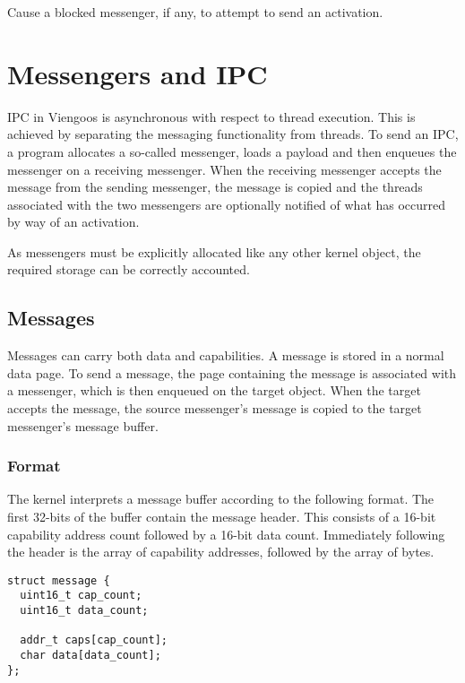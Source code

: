 Cause a blocked messenger, if any, to attempt to send an activation.


\chapter{Messengers and IPC}

IPC in Viengoos is asynchronous with respect to thread execution.
This is achieved by separating the messaging functionality from
threads.  To send an IPC, a program allocates a so-called messenger,
loads a payload and then enqueues the messenger on a receiving
messenger.  When the receiving messenger accepts the message from the
sending messenger, the message is copied and the threads associated
with the two messengers are optionally notified of what has occurred by
way of an activation.

As messengers must be explicitly allocated like any other kernel
object, the required storage can be correctly accounted.

\section{Messages}

Messages can carry both data and capabilities.  A message is stored in
a normal data page.  To send a message, the page containing the
message is associated with a messenger, which is then enqueued on the
target object.  When the target accepts the message, the source
messenger's message is copied to the target messenger's message
buffer.

\subsection{Format}

The kernel interprets a message buffer according to the following
format.  The first 32-bits of the buffer contain the message header.
This consists of a 16-bit capability address count followed by a
16-bit data count.  Immediately following the header is the array of
capability addresses, followed by the array of bytes.

\begin{lstlisting}[float,caption=Message format.,frame=single,captionpos=b]
struct message {
  uint16_t cap_count;
  uint16_t data_count;

  addr_t caps[cap_count];
  char data[data_count];
};
\end{lstlisting}


